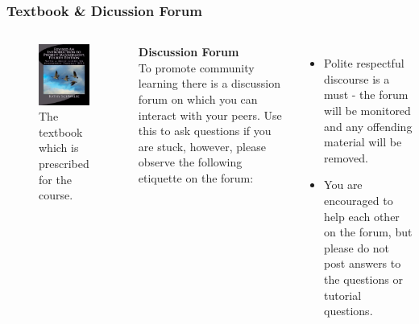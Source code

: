\documentclass{beamer}
\begin{document}
\begin{frame}
\frametitle{Textbook \& Dicussion Forum}

\begin{columns}
\begin{figure}
\includegraphics[scale=0.3]{textbook}
\caption{The textbook which is prescribed for the course.}
\end{figure}
\textbf{Discussion Forum}\\
\vspace{0.5cm} \small
To promote community learning there is a discussion forum on which you can interact with your peers. Use this to ask questions if you are stuck, however, please observe the following etiquette on the forum:
\begin{itemize}
\item Polite respectful discourse is a must - the forum will be monitored and any offending material will be removed.
\item You are encouraged to help each other on the forum, but please do not post answers to the questions or tutorial questions. 
\end{itemize}
\end{columns}

\end{frame}
\end{document}
